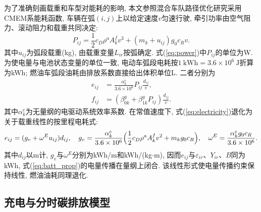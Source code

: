 \documentclass{setp-new}
\begin{document}
为了准确刻画载重和车型对能耗的影响,
本文参照混合车队路径优化研究\cite{ref:27}采用CMEM系能耗函数\cite{ref:36,ref:47},
车辆在弧$(i,j)$上以给定速度$v$匀速行驶,
牵引功率由空气阻力、滚动阻力和载重共同决定:
\begin{equation}
P_{ij}=\frac12c_D\rho^a A_k^f v^3+(m_k+u_{ij})g_0c_R v.
\label{eq:power}
\end{equation}
其中$u_{ij}$为弧段载重(kg), 由载重变量$L_{ir}$按弧确定.
式(\ref{eq:power})中$P_{ij}$的单位为W. 为使电量与电池状态变量的单位一致,
电动车弧段电耗按$1\ \mathrm{kWh}=3.6\times10^{6}\ \mathrm{J}$折算为kWh;
燃油车弧段油耗由排放系数直接给出体积单位L. 二者分别为
\begin{align}
e_{ij}&=\frac{\alpha_k^e}{3.6\times10^{6}}P_{ij}\frac{d_{ij}}{v}, \label{eq:electricity}\\
f_{ij}&=(\beta_{0k}^g+\beta_{1k}^gP_{ij})\frac{d_{ij}}{v}. \label{eq:fuel}
\end{align}
其中$\alpha_k^e$为无量纲的电驱动系统效率系数.
在常值速度下, 式(\ref{eq:electricity})退化为关于载重线性的按里程电耗式:
\begin{equation}
e_{ij}=(g_v+\omega^E u_{ij})d_{ij},\quad
g_v=\frac{\alpha_k^e}{3.6\times10^{6}}\Bigl(\frac12c_D\rho^a A_k^f v^2+m_k g_0 c_R\Bigr),\quad
\omega^E=\frac{\alpha_k^e g_0 c_R}{3.6\times10^{6}}.
\label{eq:linear_energy}
\end{equation}
其中$d_{ij}$以m计, $g_v$与$\omega^E$分别为kWh/m和kWh/(kg$\cdot$m),
因而$e_{ij}$与$\varepsilon_{ir}$、$Y_{ir}$、$B$同为kWh, 式(\ref{eq:batt_prop})的电量传播在量纲上闭合.
该线性形式使电量传播约束保持线性, 燃油油耗同理退化.

\subsection{充电与分时碳排放模型}
\end{document}
